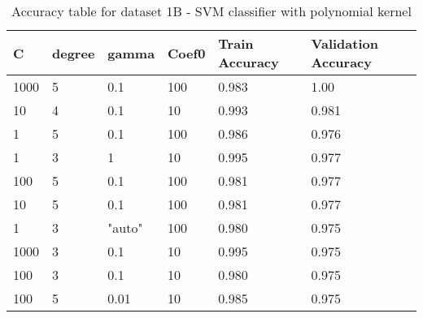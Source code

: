 \def\arraystretch{1.25}
\begin{table}[H]
\centering
\begin{tabular}{l l l l l l}
\hline
\hline
\textbf{C} & \textbf{degree} & \textbf{gamma} & \textbf{Coef0} & \textbf{Train Accuracy} & \textbf{Validation Accuracy}\\
\hline
\hline
1000 & 5 & 0.1 & 100 & 0.983 & 1.00 \\
10 & 4 & 0.1 & 10 & 0.993 & 0.981 \\
1 & 5 & 0.1 & 100 & 0.986 & 0.976  \\
1 & 3 & 1 & 10 & 0.995 & 0.977 \\
100 & 5 & 0.1 & 100 & 0.981 & 0.977 \\
10 & 5 & 0.1 & 100 & 0.981 & 0.977 \\
1 & 3 & "auto" & 100 & 0.980 & 0.975 \\
1000 & 3 & 0.1 & 10 & 0.995 & 0.975 \\
100 & 3 & 0.1 & 10 & 0.980 & 0.975 \\
100 & 5 & 0.01 & 10 & 0.985 & 0.975 \\

\hline
\end{tabular}
\caption{Accuracy table for dataset 1B - SVM classifier with polynomial kernel}
\end{table}